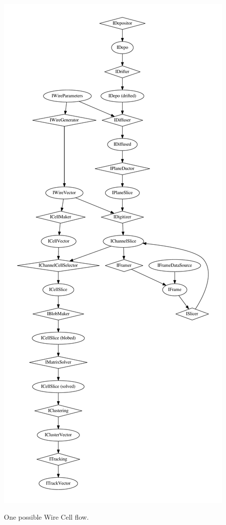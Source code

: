 \begin{frame}[fragile]
\begin{columns}
\begin{column}{0.3\textwidth}
        \includegraphics[width=\textwidth]{dataflow.pdf}

        \tiny One possible Wire Cell flow.
      \end{column}
    \end{columns}
\end{frame}

